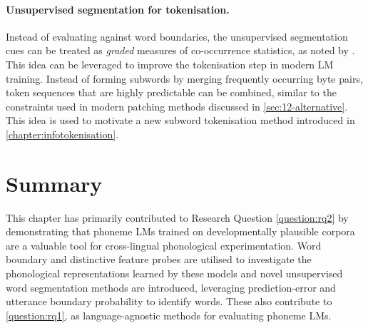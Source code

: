 \paragraph{Unsupervised segmentation for tokenisation.} Instead of evaluating against word boundaries, the unsupervised segmentation cues can be treated as \emph{graded} measures of co-occurrence statistics, as noted by \citet{elman-1990-finding}. This idea can be leveraged to improve the tokenisation step in modern LM training. Instead of forming subwords by merging frequently occurring byte pairs, token sequences that are highly predictable can be combined, similar to the constraints used in modern patching methods discussed in \cref{sec:12-alternative}. This idea is used to motivate a new subword tokenisation method introduced in \cref{chapter:infotokenisation}. 



\section{Summary}

This chapter has primarily contributed to Research Question \ref{question:rq2} by demonstrating that phoneme LMs trained on developmentally plausible corpora are a valuable tool for cross-lingual phonological experimentation. Word boundary and distinctive feature probes are utilised to investigate the phonological representations learned by these models and novel unsupervised word segmentation methods are introduced, leveraging prediction-error and utterance boundary probability to identify words. These also contribute to \ref{question:rq1}, as language-agnostic methods for evaluating phoneme LMs. 


